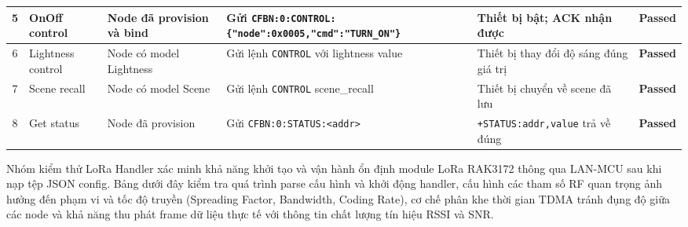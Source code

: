 \begin{longtable}{|c|p{2cm}|p{2cm}|p{4cm}|p{4cm}|c|}
            5 & OnOff control & Node đã provision và bind & Gửi \texttt{CFBN:0:CONTROL:}\newline\texttt{\{"node":0x0005,}\newline\texttt{"cmd":"TURN\_ON"\}} & Thiết bị bật; ACK nhận được & \textcolor{modern_blue}{\textbf{Passed}} \\ \hline

            6 & Lightness control & Node có model Lightness & Gửi lệnh \texttt{CONTROL} với lightness value & Thiết bị thay đổi độ sáng đúng giá trị & \textcolor{modern_blue}{\textbf{Passed}} \\ \hline

            7 & Scene recall & Node có model Scene & Gửi lệnh \texttt{CONTROL} scene\_recall & Thiết bị chuyển về scene đã lưu & \textcolor{modern_blue}{\textbf{Passed}} \\ \hline

            8 & Get status & Node đã provision & Gửi \texttt{CFBN:0:}\newline\texttt{STATUS:<addr>} & \texttt{+STATUS:addr,}\newline\texttt{value} trả về đúng & \textcolor{modern_blue}{\textbf{Passed}} \\ \hline
        \end{longtable}

        Nhóm kiểm thử LoRa Handler xác minh khả năng khởi tạo và vận hành ổn định module LoRa RAK3172 thông qua LAN-MCU sau khi nạp tệp JSON config. Bảng dưới đây kiểm tra quá trình parse cấu hình và khởi động handler, cấu hình các tham số RF quan trọng ảnh hưởng đến phạm vi và tốc độ truyền (Spreading Factor, Bandwidth, Coding Rate), cơ chế phân khe thời gian TDMA tránh đụng độ giữa các node và khả năng thu phát frame dữ liệu thực tế với thông tin chất lượng tín hiệu RSSI và SNR.

